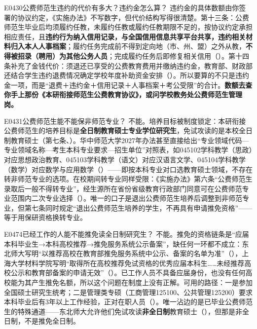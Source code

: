 \begin{qa}{E0430}{公费师范生违约的代价有多大？违约金怎么算？}
违约金的具体数额由你签署的协议约定，《实施办法》不写数字，但代价结构写得很清楚。第十三条：公费师范生毕业后均须履约任教，未履约任教或履约任教期限不足的，按协议约定承担相应责任，且\textbf{违约行为纳入信用记录，与全国信用信息共享平台共享，违约相关材料归入本人人事档案}；履约任务完成前不得到定向地（市、州、盟）之外从教，\textbf{不得被招录（聘用）为其他公务人员}；完成履约任务后即修复相关信用（）。第十四条补充了金钱代价：须退还已享受的公费教育费用并缴纳违约金，教育部、财政部还结合学生违约退费情况确定学校年度补助资金安排（）。所以要算的不只是违约金一项，而是“退费＋违约金＋信用记录＋人事档案＋考公受限”的合计。\textbf{数额去查你手上那份《本研衔接师范生公费教育协议》，或问学校教务处公费师范生管理岗。}
\end{qa}

\begin{qa}{E0431}{公费师范生能不能保非师范专业？}
不能。培养目标被制度锁定：本研衔接公费师范生的培养目标是\textbf{全日制教育硕士专业学位研究生}，免试攻读的是本校全日制教育硕士（第七条、）。华中师范大学2027年办法甚至直接给出“专业领域代码—专业领域名称—考生本科专业要求—招生单位”对照表，如045102学科教学（思政）对应思想政治教育、045103学科教学（语文）对应汉语言文学、045104学科教学（数学）对应数学与应用数学（）——即按本科专业对口选教育硕士领域，不存在转非师范专业的选项。在校期间转专业同样受限：《实施办法》第六条“公费师范生录取后一般不得转专业”，经生源所在省份省级教育行政部门同意可在公费师范专业范围内二次专业选择（）。唯一的口子是退出公费师范生培养后调整到非师范专业，但第七条同时规定“退出公费师范生培养的学生，不再具有申请推免资格”——等于用保研资格换转专业。
\end{qa}

\begin{qa}{E0474}{已经工作的人能不能推免读全日制研究生？}
不能。推免的资格链条是“应届本科毕业生→本科高校推荐→推免服务系统公示备案”，缺任何一环都不成立：东北师大写明“以推荐高校在教育部推免服务系统中公示、备案的名单为准”（），上海大学材料学院写明“取得所在高校推荐免试资格的优秀应届本科生……未经推荐高校公示和教育部备案的申请无效”（）。已工作人员不具备应届身份，也没有任何高校能为其产生推免名额，所以这个问题在制度上没有正解。可用的路径：一是参加全国硕士研究生统考；二是管理类专硕（工商管理125100、公共管理125200）要求本科毕业后有3年以上工作经验，正对在职人员（）。唯一沾边的是已毕业公费师范生的特殊通道——东北师大允许他们免试攻读\textbf{非全日制}教育硕士（），但那是非全日制，不是推免全日制。
\end{qa}


